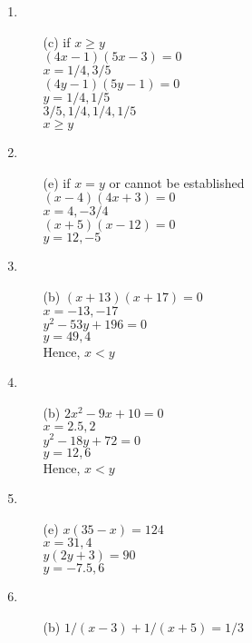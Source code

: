 \begin{multicols}{2}
\begin{enumerate}
\item
\begin{itemize}
\item[(c)] if $x \geq y$\\
  $(4x - 1)(5x - 3) = 0$\\
  $x = 1/4, 3/5$\\
  $(4y - 1)(5y - 1) = 0$\\
  $y = 1/4, 1/5$\\
  $3/5, 1/4, 1/4, 1/5$\\
  $x \geq y$
\end{itemize}
\item
  \begin{itemize}
  \item[(e)] if $x = y$ or cannot be established\\
    $(x - 4)(4x + 3) = 0$\\
    $x = 4, -3/4$\\
    $(x + 5)(x-12) = 0$\\
    $y = 12, -5$
  \end{itemize}
\item
\begin{itemize}
\item[(b)] $(x + 13)(x + 17) = 0$\\
  $x = -13, -17$\\
  $y^2 - 53y + 196 = 0$\\
  $y = 49, 4$\\
  Hence, $x < y$
\end{itemize}
\item
\begin{itemize}
\item[(b)] $2x^2 - 9x + 10 = 0$\\
  $x = 2.5,2$\\
  $y^2 - 18y + 72 = 0$\\
  $y = 12,6$\\
  Hence, $x < y$
\end{itemize}
\item
\begin{itemize}
\item[(e)] $x(35 - x) = 124$\\
  $x = 31,4$\\
  $y(2y + 3) = 90$\\
  $y = -7.5,6$\\
\end{itemize}
\item
\begin{itemize}
\item[(b)] $1/(x - 3) + 1/(x + 5) = 1/3$\\

\end{itemize}
\end{enumerate}
\end{multicols}
